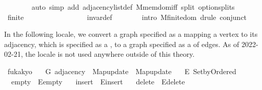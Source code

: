 \begin{isabellebody}
\ \ \ \ \ \ \isamarkupfalse%
\ {\isacharparenleft}{\kern0pt}auto\ simp\ add{\isacharcolon}{\kern0pt}\ adjacency{\isacharunderscore}{\kern0pt}list{\isacharunderscore}{\kern0pt}def\ M{\isachardot}{\kern0pt}mem{\isacharunderscore}{\kern0pt}dom{\isacharunderscore}{\kern0pt}iff\ split{\isacharcolon}{\kern0pt}\ option{\isachardot}{\kern0pt}splits{\isacharparenright}{\kern0pt}\isanewline
\ \ \ \ \isamarkupfalse%
\ {\isachardoublequoteopen}finite\ {\isachardot}{\kern0pt}{\isachardot}{\kern0pt}{\isachardot}{\kern0pt}{\isachardoublequoteclose}\isanewline
\ \ \ \ \ \ \isamarkupfalse%
\ {}\isanewline
\ \ \ \ \ \ \isamarkupfalse%
\ invar{\isacharunderscore}{\kern0pt}def\isanewline
\ \ \ \ \ \ \isamarkupfalse%
\ {\isacharparenleft}{\kern0pt}intro\ M{\isachardot}{\kern0pt}finite{\isacharunderscore}{\kern0pt}dom{\isacharparenright}{\kern0pt}\ {\isacharparenleft}{\kern0pt}drule\ conjunct{}{\isacharparenright}{\kern0pt}\isanewline
\ \ \isamarkupfalse%
\isanewline
{}\isamarkupfalse%
%
\endisatagproof
{\isafoldproof}%
%
\isadelimproof
\isanewline
%
\endisadelimproof
{}\isamarkupfalse%
%
\isadeliminvisible
%
\endisadeliminvisible
%
\isataginvisible
%
\begin{isamarkuptext}%
In the following locale, we convert a graph specified as a  mapping a vertex
to its adjacency, which is specified as a , to a graph specified as a
 of edges. As of 2022-02-21, the locale is not used anywhere outside of this
theory.%
\end{isamarkuptext}\isamarkuptrue%
\isamarkupfalse%
\ fukakyo\ {\isacharequal}{\kern0pt}\isanewline
\ \ G{\isacharcolon}{\kern0pt}\ adjacency\ \ Map{\isacharunderscore}{\kern0pt}update\ {\isacharequal}{\kern0pt}\ Map{\isacharunderscore}{\kern0pt}update\ {\isacharplus}{\kern0pt}\isanewline
\ \ E{\isacharcolon}{\kern0pt}\ Set{\isacharunderscore}{\kern0pt}by{\isacharunderscore}{\kern0pt}Ordered\ \isanewline
\ \ empty\ {\isacharequal}{\kern0pt}\ E{\isacharunderscore}{\kern0pt}empty\ \isanewline
\ \ insert\ {\isacharequal}{\kern0pt}\ E{\isacharunderscore}{\kern0pt}insert\ \isanewline
\ \ delete\ {\isacharequal}{\kern0pt}\ E{\isacharunderscore}{\kern0pt}delete\ \isanewline

\end{isabellebody}
